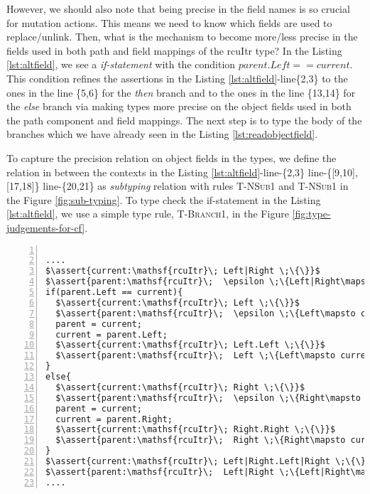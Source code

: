 However, we should also note that being precise in the field names is so crucial for mutation actions. This means we need to know which fields are used to replace/unlink. Then, what is the mechanism to become more/less precise in the fields used in both path and field mappings of the \textsf{rcuItr} type? In the Listing \ref{lst:altfield}, we see a \textit{if-statement} with the condition $parent.Left == current$. This condition refines the assertions in the Listing \ref{lst:altfield}-line\{2,3\} to the ones in the line \{5,6\} for the \textit{then} branch and to the ones in the line \{13,14\} for the \textit{else} branch via making types more precise  on the object fields used in both the path component and field mappings. The next step is to type the body of the branches which we have already seen in the Listing \ref{lst:readobjectfield}. 

To capture the precision relation on object fields in the types, we define the relation in between the contexts in the Listing \ref{lst:altfield}-line-\{2,3\} line-\{[9,10],[17,18]\} line-\{20,21\} as \textit{subtyping} relation with rules \textsc{T-NSub1} and \textsc{T-NSub1} in the Figure \ref{fig:sub-typing}. To type check the \textsf{if-statement} in the Listing \ref{lst:altfield}, we use a simple type rule, \textsc{T-Branch1}, in the Figure \ref{fig:type-judgements-for-cf}.
\begin{lstlisting}[caption={Choosing fields to read},label={lst:altfield}, numbers=left, numberstyle=\tiny\color{red}, numbersep=5pt]%, basicstyle=\scriptsize]

....
$\assert{current:\mathsf{rcuItr}\; Left|Right \;\{\}}$
$\assert{parent:\mathsf{rcuItr}\;  \epsilon \;\{Left|Right\mapsto current\}}$
if(parent.Left == current){
  $\assert{current:\mathsf{rcuItr}\; Left \;\{\}}$
  $\assert{parent:\mathsf{rcuItr}\;  \epsilon \;\{Left\mapsto current\}}$
  parent = current;
  current = parent.Left;
  $\assert{current:\mathsf{rcuItr}\; Left.Left \;\{\}}$
  $\assert{parent:\mathsf{rcuItr}\;  Left \;\{Left\mapsto current\}}$
}
else{
  $\assert{current:\mathsf{rcuItr}\; Right \;\{\}}$
  $\assert{parent:\mathsf{rcuItr}\;  \epsilon \;\{Right\mapsto current\}}$
  parent = current;
  current = parent.Right;
  $\assert{current:\mathsf{rcuItr}\; Right.Right \;\{\}}$
  $\assert{parent:\mathsf{rcuItr}\;  Right \;\{Right\mapsto current\}}$
}
$\assert{current:\mathsf{rcuItr}\; Left|Right.Left|Right \;\{\}}$
$\assert{parent:\mathsf{rcuItr}\;  Left|Right \;\{Left|Right\mapsto current\}}$
....
\end{lstlisting}

